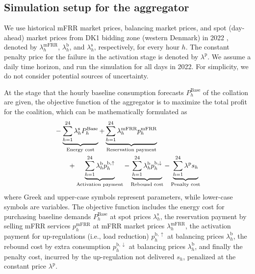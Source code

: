 \documentclass[conference]{IEEEtran}
\begin{document}
\subsection{Simulation setup for the aggregator}
We use historical mFRR market prices, balancing market prices, and spot (day-ahead) market prices from DK1 bidding zone (western Denmark) in 2022 \cite{energinet:energidataservice}, denoted by $\lambda_{h}^{\text{mFRR}}$, $\lambda_{h}^{\text{b}}$, and $\lambda_{h}^{\text{s}}$, respectively,  for every hour $h$. The constant penalty price for the failure in the activation stage is denoted by $\lambda^{\text{p}}$. We assume a daily time horizon, and run the simulation for all days in 2022. For simplicity, we do not consider potential sources of uncertainty.

At the stage that the hourly baseline consumption forecasts $P^{\text{Base}}_{h}$ of the collation are given, the objective function of the aggregator is to maximize the total profit for the coalition, which can be mathematically formulated as
%
\begin{align}\label{eq:mFRRObjective}
     &  - \underbrace{\sum_{h=1}^{24} \lambda^{\text{s}}_{h}P^{\text{Base}}_{h}}_{\textrm{Energy cost}} + \underbrace{\sum_{h=1}^{24}\lambda_{h}^{\text{mFRR}} p^{\text{mFRR}}_{h}}_{\textrm{Reservation payment}}  \notag \\ & \quad \quad + \underbrace{\sum_{h=1}^{24}  \lambda_{h}^{\text{b}} p^{\text{b},\uparrow}_{h}}_{\textrm{Activation payment}} - \underbrace{\sum_{h=1}^{24}  \lambda_{h}^{\text{b}} p^{\text{b},\downarrow}_{h}}_{\textrm{Rebound cost}} - \underbrace{ \sum_{h=1}^{24}  \lambda^{\text{p}}s_{h}}_{\textrm{Penalty cost}}
\end{align}
where Greek and upper-case symbols represent parameters, while lower-case symbols are variables. The objective function includes the energy cost for purchasing baseline demands $P^{\text{Base}}_{h}$ at spot prices $\lambda^{\text{s}}_{h}$, the reservation payment by selling mFRR services $p^{\text{mFRR}}_{h}$ at mFRR market prices $\lambda_{h}^{\text{mFRR}}$, the activation payment for up-regulations (i.e., load reduction) $p^{\text{b},\uparrow}_{h}$ at balancing prices $\lambda_{h}^{\text{b}}$, the rebound cost by extra consumption $p^{\text{b},\downarrow}_{h}$ at balancing prices $\lambda_{h}^{\text{b}}$, and finally the penalty cost, incurred by the up-regulation not delivered $s_{h}$, penalized at the constant price $\lambda^{\text{p}}$. %
\end{document}
